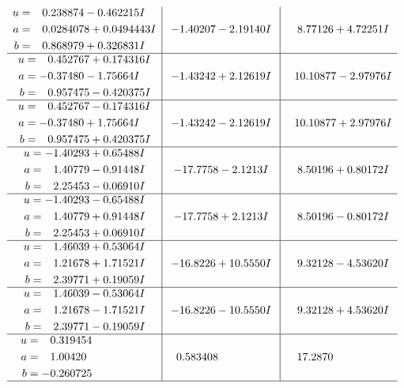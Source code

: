 \documentclass[1p]{elsarticle_modified}
\theoremstyle{definition}
\begin{document}
$$\begin{array}{c|c|c}
\begin{aligned}
u &= \phantom{-}0.238874 - 0.462215 I \\
a &= \phantom{-}0.0284078 + 0.0494443 I \\
b &= \phantom{-}0.868979 + 0.326831 I\end{aligned}
 & -1.40207 - 2.19140 I & \phantom{-}8.77126 + 4.72251 I \\ \hline\begin{aligned}
u &= \phantom{-}0.452767 + 0.174316 I \\
a &= -0.37480 - 1.75664 I \\
b &= \phantom{-}0.957475 - 0.420375 I\end{aligned}
 & -1.43242 + 2.12619 I & \phantom{-}10.10877 - 2.97976 I \\ \hline\begin{aligned}
u &= \phantom{-}0.452767 - 0.174316 I \\
a &= -0.37480 + 1.75664 I \\
b &= \phantom{-}0.957475 + 0.420375 I\end{aligned}
 & -1.43242 - 2.12619 I & \phantom{-}10.10877 + 2.97976 I \\ \hline\begin{aligned}
u &= -1.40293 + 0.65488 I \\
a &= \phantom{-}1.40779 - 0.91448 I \\
b &= \phantom{-}2.25453 - 0.06910 I\end{aligned}
 & -17.7758 - 2.1213 I & \phantom{-}8.50196 + 0.80172 I \\ \hline\begin{aligned}
u &= -1.40293 - 0.65488 I \\
a &= \phantom{-}1.40779 + 0.91448 I \\
b &= \phantom{-}2.25453 + 0.06910 I\end{aligned}
 & -17.7758 + 2.1213 I & \phantom{-}8.50196 - 0.80172 I \\ \hline\begin{aligned}
u &= \phantom{-}1.46039 + 0.53064 I \\
a &= \phantom{-}1.21678 + 1.71521 I \\
b &= \phantom{-}2.39771 + 0.19059 I\end{aligned}
 & -16.8226 + 10.5550 I & \phantom{-}9.32128 - 4.53620 I \\ \hline\begin{aligned}
u &= \phantom{-}1.46039 - 0.53064 I \\
a &= \phantom{-}1.21678 - 1.71521 I \\
b &= \phantom{-}2.39771 - 0.19059 I\end{aligned}
 & -16.8226 - 10.5550 I & \phantom{-}9.32128 + 4.53620 I \\ \hline\begin{aligned}
u &= \phantom{-}0.319454\phantom{ +0.000000I} \\
a &= \phantom{-}1.00420\phantom{ +0.000000I} \\
b &= -0.260725\phantom{ +0.000000I}\end{aligned}
 & \phantom{-}0.583408\phantom{ +0.000000I} & \phantom{-}17.2870\phantom{ +0.000000I}\\
 \hline 
 \end{array}$$\newpage\newpage\renewcommand{\arraystretch}{1}
\end{document}
